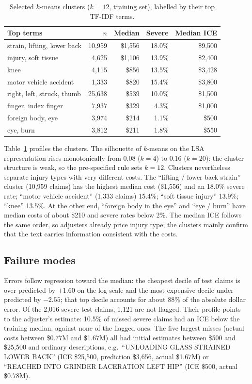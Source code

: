 \documentclass[10pt,twocolumn,letterpaper]{article}
\begin{document}
\begin{table}[t]
\centering
\caption{Selected $k$-means clusters ($k=12$, training set), labelled by their top TF-IDF terms.}
\label{tab:clusters}
\footnotesize
\setlength{\tabcolsep}{3pt}
\begin{tabular}{@{}lrrrr@{}}
\toprule
\textbf{Top terms} & \textbf{$n$} & \textbf{Median} & \textbf{Severe} & \textbf{Median ICE} \\
\midrule
strain, lifting, lower back   & 10,959 & \$1,556 & 18.0\% & \$9,500 \\
injury, soft tissue           & 4,625  & \$1,106 & 13.9\% & \$2,400 \\
knee                          & 4,115  & \$856   & 13.5\% & \$3,428 \\
motor vehicle accident        & 1,333  & \$820   & 15.4\% & \$3,800 \\
right, left, struck, thumb    & 25,638 & \$539   & 10.0\% & \$1,500 \\
finger, index finger          & 7,937  & \$329   & 4.3\%  & \$1,000 \\
foreign body, eye             & 3,974  & \$214   & 1.1\%  & \$500 \\
eye, burn                     & 3,812  & \$211   & 1.8\%  & \$550 \\
\bottomrule
\end{tabular}
\end{table}

Table~\ref{tab:clusters} profiles the clusters. The silhouette of $k$-means on the LSA representation rises monotonically from 0.08 ($k=4$) to 0.16 ($k=20$): the
cluster structure is weak, so the pre-specified rule sets $k=12$. Clusters nevertheless separate injury types with very
different costs. The ``lifting / lower back strain'' cluster (10,959 claims) has the highest median cost (\$1,556) and an
18.0\% severe rate; ``motor vehicle accident'' (1,333 claims) 15.4\%; ``soft tissue injury'' 13.9\%; ``knee'' 13.5\%. At
the other end, ``foreign body in the eye'' and ``eye / burn'' have median costs of about \$210 and severe rates below 2\%.
The median ICE follows the same order, so adjusters already price injury type; the clusters mainly confirm that the text
carries information consistent with the costs.

\subsection{Failure modes}
Errors follow regression toward the median: the cheapest decile of test claims is over-predicted by $+1.60$ on the log
scale and the most expensive decile under-predicted by $-2.55$; that top decile accounts for about 88\% of the
absolute dollar error. Of the 2,016 severe test claims, 1,121 are not flagged. Their profile points to the adjuster's estimate: 10.5\% of
missed severe claims had an ICE below the training median, against none of the flagged ones. The five largest misses
(actual costs between \$0.77M and \$1.67M) all had initial estimates between \$500 and \$25,500 and ordinary descriptions,
e.g.\ ``UNLOADING GLASS STRAINED LOWER BACK'' (ICE \$25,500, prediction \$3,656, actual \$1.67M) or ``REACHED INTO GRINDER
LACERATION LEFT HIP'' (ICE \$500, actual \$0.78M).
\end{document}
